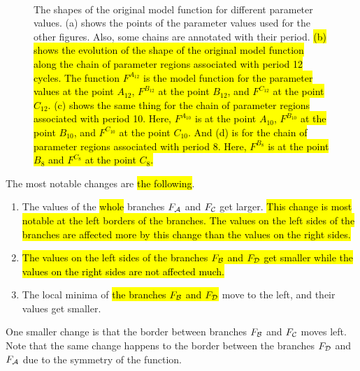 \begin{figure}
	\centering
	 \\
	\caption[Effects of parameters on the original model function]{
		The shapes of the original model function for different parameter values.
		(a) shows the points of the parameter values used for the other figures.
		Also, some chains are annotated with their period.
		\hl{
			(b) shows the evolution of the shape of the original model function along the chain of parameter regions associated with period 12 cycles.
			The function $F^{A_{12}}$ is the model function for the parameter values at the point $A_{12}$, $F^{B_{12}}$ at the point $B_{12}$, and $F^{C_{12}}$ at the point $C_{12}$.
			(c) shows the same thing for the chain of parameter regions associated with period 10.
			Here, $F^{A_{10}}$ is at the point $A_{10}$, $F^{B_{10}}$ at the point $B_{10}$, and $F^{C_{10}}$ at the point $C_{10}$.
			And (d) is for the chain of parameter regions associated with period 8.
			Here, $F^{B_8}$ is at the point $B_8$ and $F^{C_8}$ at the point $C_8$.
		}
	}
	\label{fig:setup.char.evolution.combined}
\end{figure}

The most notable changes are \hl{the following}.
\begin{enumerate}
	\item The values of the \hl{whole} branches $F_{\mathcal{A}}$ and $F_{\mathcal{C}}$ get larger.
	      \hl{
		      This change is most notable at the left borders of the branches.
		      The values on the left sides of the branches are affected more by this change than the values on the right sides.
	      }
	\item \hl{
		      The values on the left sides of the branches $F_{\mathcal{B}}$ and $F_{\mathcal{D}}$ get smaller while the values on the right sides are not affected much.
	      }
	\item The local minima of \hl{the branches $F_{\mathcal{B}}$ and $F_{\mathcal{D}}$} move to the left, and their values get smaller.
\end{enumerate}
One smaller change is that the border between branches $F_{\mathcal{B}}$ and $F_{\mathcal{C}}$ moves left.
Note that the same change happens to the border between the branches $F_{\mathcal{D}}$ and $F_{\mathcal{A}}$ due to the symmetry of the function.

